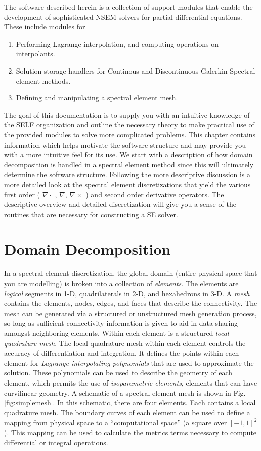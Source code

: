 \documentclass[12pt]{softwaremanual}
\begin{document}
 The software described herein is a collection of support modules that enable the development of sophisticated NSEM solvers for partial differential equations. These include modules for 
 \begin{enumerate}
 \item Performing Lagrange interpolation, and computing operations on interpolants.
 \item Solution storage handlers for Continous and Discontinuous Galerkin Spectral element methods.
 \item Defining and manipulating a spectral element mesh.
 \end{enumerate}
 
 The goal of this documentation is to supply you with an intuitive knowledge of the SELF organization and outline the necessary theory to make practical use of the provided modules to solve more complicated problems. This chapter contains information which helps motivate the software structure and may provide you with a more intuitive feel for its use. We start with a description of how domain decomposition is handled in a spectral element method since this will ultimately determine the software structure. Following the more descriptive discussion is a more detailed look at the spectral element discretizations that yield the various first order ( $\nabla \cdot$ , $\nabla$, $\nabla \times $ ) and second order derivative operators. The descriptive overview and detailed discretization will give you a sense of the routines that are necessary for constructing a SE solver.
 
\section{Domain Decomposition}
   In a spectral element discretization, the global domain (entire physical space that you are modelling) is broken into a collection of \textit{elements}. The elements are \textit{logical} segments in 1-D, quadrilaterals in 2-D, and hexahedrons in 3-D. A \textit{mesh} contains the elements, nodes, edges, and faces that describe the connectivity. The mesh can be generated via a structured or unstructured mesh generation process, so long as sufficient connectivity information is given to aid in data sharing amongst neighboring elements. Within each element is a structured \textit{local quadrature mesh}. The local quadrature mesh within each element controls the accuracy of differentiation and integration. It defines the points within each element for \textit{Lagrange interpolating polynomials} that are used to approximate the solution. These polynomials can be used to describe the geometry of each element, which permits the use of \textit{isoparametric elements}, elements that can have curvilinear geometry. A schematic of a spectral element mesh is shown in Fig. \ref{fig:simplemesh}. In this schematic, there are four elements. Each contains a local quadrature mesh. The boundary curves of each element can be used to define a mapping from physical space to a ``computational space'' (a square over $[-1,1]^2$). This mapping can be used to calculate the metrics terms necessary to compute differential or integral operations.
 
\end{document}
